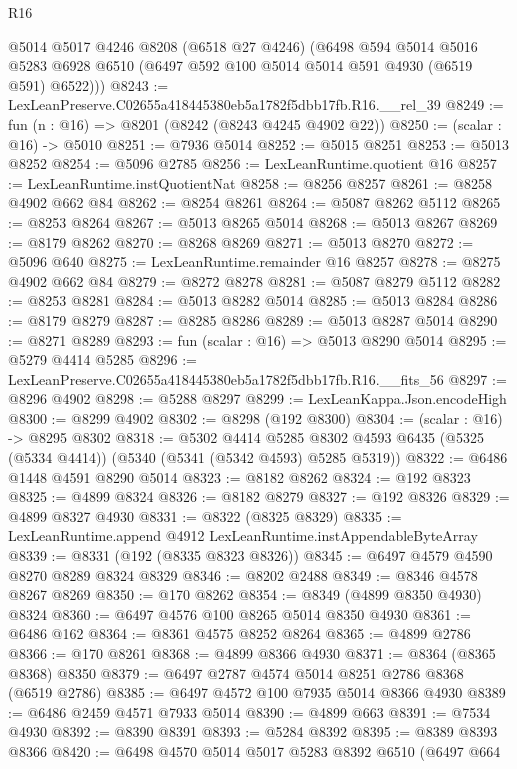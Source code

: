 \begin{lexlean}{R16}
\begin{coremodule}
      @5014
      @5017
      @4246
      @8208
      (@6518 @27 @4246)
      (@6498
        @594
        @5014
        @5016
        @5283
        @6928
        @6510
        (@6497 @592 @100 @5014 @5014 @591 @4930 (@6519 @591) @6522)))
@8243 := LexLeanPreserve.C02655a418445380eb5a1782f5dbb17fb.R16.__rel_39
@8249 := fun (n : @16) => @8201 (@8242 (@8243 @4245 @4902 @22))
@8250 := (scalar : @16) -> @5010
@8251 := @7936 @5014
@8252 := @5015 @8251
@8253 := @5013 @8252
@8254 := @5096 @2785
@8256 := LexLeanRuntime.quotient @16
@8257 := LexLeanRuntime.instQuotientNat
@8258 := @8256 @8257
@8261 := @8258 @4902 @662 @84
@8262 := @8254 @8261
@8264 := @5087 @8262 @5112
@8265 := @8253 @8264
@8267 := @5013 @8265 @5014
@8268 := @5013 @8267
@8269 := @8179 @8262
@8270 := @8268 @8269
@8271 := @5013 @8270
@8272 := @5096 @640
@8275 := LexLeanRuntime.remainder @16 @8257
@8278 := @8275 @4902 @662 @84
@8279 := @8272 @8278
@8281 := @5087 @8279 @5112
@8282 := @8253 @8281
@8284 := @5013 @8282 @5014
@8285 := @5013 @8284
@8286 := @8179 @8279
@8287 := @8285 @8286
@8289 := @5013 @8287 @5014
@8290 := @8271 @8289
@8293 := fun (scalar : @16) => @5013 @8290 @5014
@8295 := @5279 @4414 @5285
@8296 := LexLeanPreserve.C02655a418445380eb5a1782f5dbb17fb.R16.__fits_56
@8297 := @8296 @4902
@8298 := @5288 @8297
@8299 := LexLeanKappa.Json.encodeHigh
@8300 := @8299 @4902
@8302 := @8298 (@192 @8300)
@8304 := (scalar : @16) -> @8295 @8302
@8318 := @5302
    @4414
    @5285
    @8302
    @4593
    @6435
    (@5325 (@5334 @4414))
    (@5340 (@5341 (@5342 @4593) @5285 @5319))
@8322 := @6486 @1448 @4591 @8290 @5014
@8323 := @8182 @8262
@8324 := @192 @8323
@8325 := @4899 @8324
@8326 := @8182 @8279
@8327 := @192 @8326
@8329 := @4899 @8327 @4930
@8331 := @8322 (@8325 @8329)
@8335 := LexLeanRuntime.append @4912 LexLeanRuntime.instAppendableByteArray
@8339 := @8331 (@192 (@8335 @8323 @8326))
@8345 := @6497 @4579 @4590 @8270 @8289 @8324 @8329
@8346 := @8202 @2488
@8349 := @8346 @4578 @8267 @8269
@8350 := @170 @8262
@8354 := @8349 (@4899 @8350 @4930) @8324
@8360 := @6497 @4576 @100 @8265 @5014 @8350 @4930
@8361 := @6486 @162
@8364 := @8361 @4575 @8252 @8264
@8365 := @4899 @2786
@8366 := @170 @8261
@8368 := @4899 @8366 @4930
@8371 := @8364 (@8365 @8368) @8350
@8379 := @6497 @2787 @4574 @5014 @8251 @2786 @8368 (@6519 @2786)
@8385 := @6497 @4572 @100 @7935 @5014 @8366 @4930
@8389 := @6486 @2459 @4571 @7933 @5014
@8390 := @4899 @663
@8391 := @7534 @4930
@8392 := @8390 @8391
@8393 := @5284 @8392
@8395 := @8389 @8393 @8366
@8420 := @6498
    @4570
    @5014
    @5017
    @5283
    @8392
    @6510
    (@6497
      @664

\end{coremodule}
\end{lexlean}
